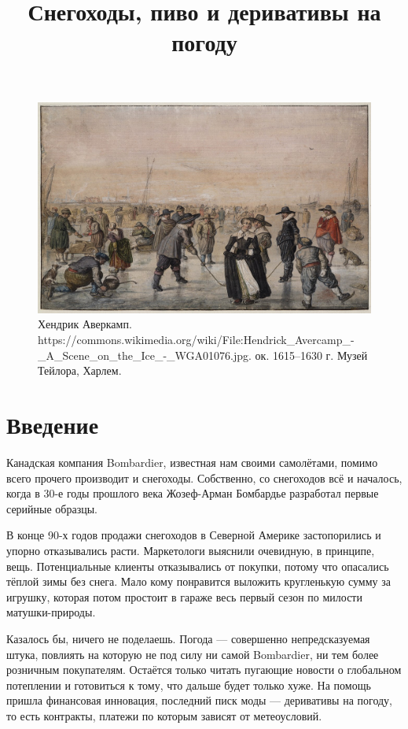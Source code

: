 
\title{Снегоходы, пиво и деривативы на погоду}



\maketitle
\thispagestyle{empty}

\begin{figure}[h]
\centering
\includegraphics[width=\textwidth]{a_scene_on_the_ice.jpg}
\captionsetup{labelformat=empty}
\caption{\small{
Хендрик Аверкамп. 
{https://commons.wikimedia.org/wiki/File:Hendrick_Avercamp_-_A_Scene_on_the_Ice_-_WGA01076.jpg}.
ок. 1615--1630 г. Музей Тейлора, Харлем.
}}
\end{figure}
\newpage

\section*{Введение}

Канадская компания Bombardier, известная нам своими самолётами, помимо всего
прочего производит и снегоходы. Собственно, со снегоходов всё и началось, когда
в 30-е годы прошлого века Жозеф-Арман Бомбардье разработал первые серийные
образцы.

В конце 90-х годов продажи снегоходов в Северной
Америке застопорились и упорно отказывались расти. Маркетологи выяснили
очевидную, в принципе, вещь. Потенциальные клиенты отказывались от покупки,
потому что опасались тёплой зимы без снега. Мало кому понравится выложить
кругленькую сумму за игрушку, которая потом простоит в гараже весь первый сезон по
милости матушки-природы.

Казалось бы, ничего не поделаешь. Погода --- совершенно непредсказуемая штука,
повлиять на которую не под силу ни самой Bombardier, ни тем более розничным
покупателям. Остаётся только читать пугающие новости о глобальном потеплении и
готовиться к тому, что дальше будет только хуже. На помощь пришла финансовая
инновация, последний писк моды --- деривативы на погоду, то есть контракты, платежи
по которым зависят от метеоусловий.

